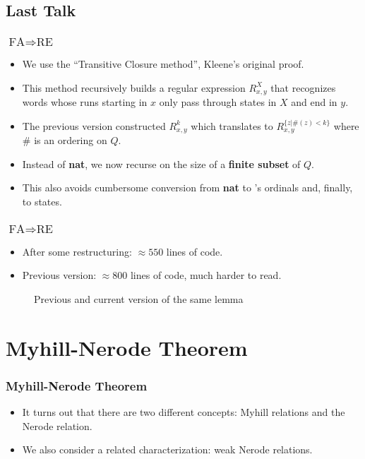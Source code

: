 \documentclass{beamer}
\begin{document}
\subsection*{Last Talk}
\begin{frame}
    \frametitle{$\mbox{FA} \Rightarrow \mbox{RE}$}
    \begin{itemize}
        \item We use the ``Transitive Closure method'', Kleene's original proof.
        \item This method recursively builds a regular expression $R^X_{x,y}$ that recognizes words whose runs starting in $x$ only pass through states in $X$ and end in $y$.
        \item The previous version constructed $R^k_{x,y}$ which translates to $R^{\{z | \#(z) < k\}}_{x,y}$ where $\#$ is an ordering on $Q$.
        \item Instead of \textbf{nat}, we now recurse on the size of a \textbf{finite subset} of $Q$.
        \item This also avoids cumbersome conversion from \textbf{nat} to \ssreflect's ordinals and, finally, to states.
    \end{itemize}
\end{frame}

\begin{frame}
    \frametitle{$\mbox{FA} \Rightarrow \mbox{RE}$}
    \begin{itemize}
        \item After some restructuring: $\approx 550$ lines of code.
        \item Previous version: $\approx 800$ lines of code, much harder to read.
    \end{itemize}
    \begin{figure}
    \begin{minipage}[t]{0.5\textwidth}

        
    \end{minipage}%
    \begin{minipage}[t]{0.5\textwidth}
        
    \end{minipage}
        \caption{Previous and current version of the same lemma}
    \end{figure}
\end{frame}

\section{Myhill-Nerode Theorem}
\begin{frame}
    \frametitle{Myhill-Nerode Theorem}
    \begin{itemize}
        \item It turns out that there are two different concepts: Myhill relations and the Nerode relation.
        \item We also consider a related characterization: weak Nerode relations.
    \end{itemize}
\end{frame}
\end{document}
